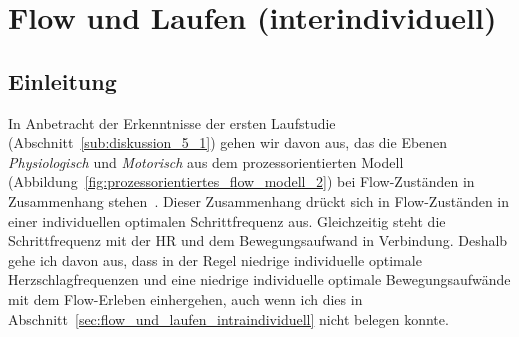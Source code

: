 

\section{Flow und Laufen (interindividuell)} 

\label{sec:flow_und_laufen_interindividuell}

\subsection{Einleitung} 

\label{sub:einleitung_5_3}

In Anbetracht der Erkenntnisse der ersten Laufstudie (Abschnitt~\ref{sub:diskussion_5_1}) gehen wir davon aus, das die Ebenen \emph{Physiologisch} und \emph{Motorisch} aus dem prozessorientierten Modell (Abbildung~\ref{fig:prozessorientiertes_flow_modell_2}) bei Flow-Zuständen in Zusammenhang stehen~\citep{Grueter2016a}. Dieser Zusammenhang drückt sich in Flow-Zuständen in einer individuellen optimalen Schrittfrequenz aus. Gleichzeitig steht die Schrittfrequenz mit der HR und dem Bewegungsaufwand in Verbindung. Deshalb gehe ich davon aus, dass in der Regel niedrige individuelle optimale Herzschlagfrequenzen und eine niedrige individuelle optimale Bewegungsaufwände mit dem Flow-Erleben einhergehen, auch wenn ich dies in Abschnitt~\ref{sec:flow_und_laufen_intraindividuell} nicht belegen konnte. 

